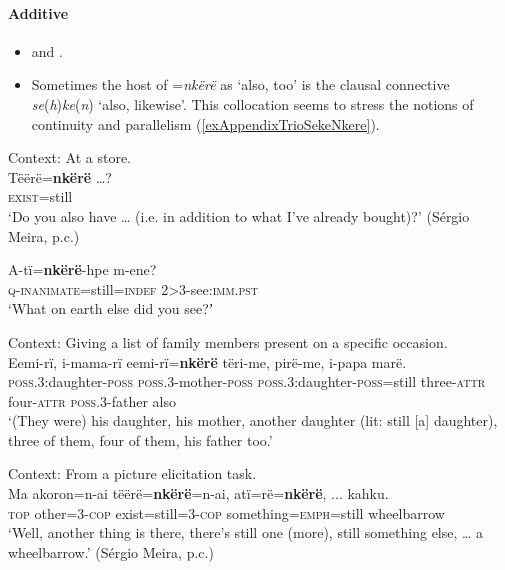 \paragraph{Additive}\label{appendixTrioAdditive}
\begin{itemize}
	\item \textcite[237, 242]{Carlin2004} and \textcite[450–451]{Meira1999}.
	\item Sometimes the host of \mbox{=\textit{nkërë}} as \lq also, too\rq{ }is the clausal connective \mbox{\textit{se}(\textit{h})\textit{ke}(\textit{n})} \lq also, likewise\rq{}. This collocation seems to stress the notions of continuity and parallelism (\ref{exAppendixTrioSekeNkere}).
\end{itemize}
\begin{exe}
	\ex\label{exAppendixTrioAlso1}
	Context: At a store.\\
	\gll Tëërë=\textbf{nkërë} …?\\
	\textsc{exist}=still\\
	\glt \lq Do you also have … (i.e. in addition to what I've already bought)?' (Sérgio Meira, p.c.)
		
	\ex\label{appendixTrioAlso2}
	\gll A-tï=\textbf{nkërë}-hpe  m-ene?\\
	\textsc{q}-\textsc{inanimate}=still=\textsc{indef} 2>3-see:\textsc{imm}.\textsc{pst}\\
	\glt \lq What on earth else did you see?ʼ \parencite[233]{Carlin2004}

	\ex\label{appendixTrioIncrement1}
	Context: Giving a list of family members present on a specific occasion.\\
	\gll Eemi-rï, i-mama-rï eemi-rï=\textbf{nkërë} tëri-me,	pirë-me, i-papa	marë.\\
	\textsc{poss}.3:daughter-\textsc{poss} \textsc{poss}.3-mother-\textsc{poss} \textsc{poss}.3:daughter-\textsc{poss}=still three-\textsc{attr} four-\textsc{attr} \textsc{poss}.3-father also\\
	\glt \lq (They were) his daughter, his mother, another daughter (lit: still [a] daughter), three of them, four of them, his father too.\rq{ }\parencite[454]{Carlin2004}	
	
	\ex\label{appendixTrioIncrement4}
	Context: From a picture elicitation task.\\
	\gll Ma akoron=n-ai tëërë=\textbf{nkërë}=n-ai, atï=rë=\textbf{nkërë}, ...  kahku.\\
	\textsc{top} other=3-\textsc{cop} exist=still=3-\textsc{cop} something=\textsc{emph}=still {} wheelbarrow\\
	\glt \lq Well, another thing is there, there's still one (more), still something else, … a wheelbarrow.' (Sérgio Meira, p.c.)	


\end{exe}
